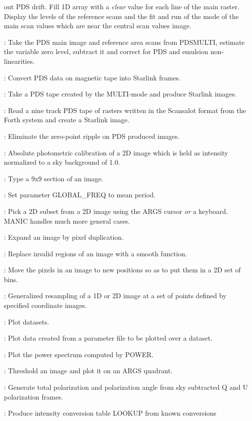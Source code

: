 \begin{description}
out PDS drift.
Fill 1D array with a {\em clear} value for each line of the main raster.
Display the levels of the reference scans and the fit and run of the mode of
the main scan values which are near the central scan values image.
\item [PDSIM]: Take the PDS main image and reference area scans from PDSMULTI,
estimate the variable zero level, subtract it and correct for PDS and emulsion
non-linearities.
\item [PDSIN]: Convert PDS data on magnetic tape into Starlink frames.
\item [PDSMULTI]: Take a PDS tape created by the MULTI-mode and produce Starlink
images.
\item [PDSRASTER]: Read a nine track PDS tape of rasters written in the
Scansalot format from the Forth system and create a Starlink image.
\item [PDSRIPPLE]: Eliminate the zero-point ripple on PDS produced images.
\item [PECALBASP]: Absolute photometric calibration of a 2D image which is held
as intensity normalized to a sky background of 1.0.
\item [PEEP]: Type a 9x9 section of an image.
\item [PERIOD]: Set parameter GLOBAL\_FREQ to mean period.
\item [PICK]: Pick a 2D subset from a 2D image using the ARGS cursor {\em or} a
keyboard.
MANIC handles much more general cases.
\item [PIXDUPE]: Expand an image by pixel duplication.
\item [PIXFILL]: Replace invalid regions of an image with a smooth function.
\item [PIXMAP]: Move the pixels in an image to new positions so as to put them
in a 2D set of bins.
\item [PIXUNMAP]: Generalized resampling of a 1D or 2D image at a set of points
defined by specified coordinate images.
\item [PLOTDAT]: Plot datasets.
\item [PLOTFIT]: Plot data created from a parameter file to be plotted over a
dataset.
\item [PLOTPS]: Plot the power spectrum computed by POWER.
\item [PLOTQTH]: Threshold an image and plot it on an ARGS quadrant.
\item [POLAR]: Generate total polarization and polarization angle from sky
subtracted Q and U polarization frames.
\item [POLFIT]: Produce intensity conversion table LOOKUP from known conversions

\end{description}
